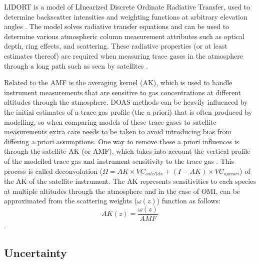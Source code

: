     \label{Model:Meas:sat:LIDORT}
    LIDORT is a model of LInearized Discrete Ordinate Radiative Transfer, used to determine backscatter intensities and weighting functions at arbitrary elevation angles \parencite{Spurr2001}.
    The model solves radiative transfer equations and can be used to determine various atmospheric column measurement attributes such as optical depth, ring effects, and scattering.
    These radiative properties (or at least estimates thereof) are required when measuring trace gases in the atmosphere through a long path such as seen by satellites \parencite[e.g.,][]{Palmer2001,Martin2002a,DeSmedt2015,Abad2015}.
    
    Related to the AMF is the averaging kernel (AK), which is used to handle instrument measurements that are sensitive to gas concentrations at different altitudes through the atmosphere.
    DOAS methods can be heavily influenced by the initial estimates of a trace gas profile (the a priori) that is often produced by modelling, so when comparing models of these trace gases to satellite measurements extra care needs to be taken to avoid introducing bias from differing a priori assumptions.
    One way to remove these a priori influences is through the satellite AK (or AMF), which takes into account the vertical profile of the modelled trace gas and instrument sensitivity to the trace gas \parencite{Eskes2003, Palmer2001}.
    This process is called deconvolution ($\Omega = AK \times VC_{satellite} + (I - AK) \times  VC_{a priori}$) of the AK of the satellite instrument.
    The AK represents sensitivities to each species at multiple altitudes through the atmosphere and in the case of OMI, can be approximated from the scattering weights ($\omega(z)$) function as follows:
    \begin{equation} \label{ch_HCHO:eqn:AKfromw}
    AK(z) = \frac{\omega(z)}{AMF}
    \end{equation}
    \parencite{Abad2015}.
    
    
  
  \subsection{Uncertainty}
  
